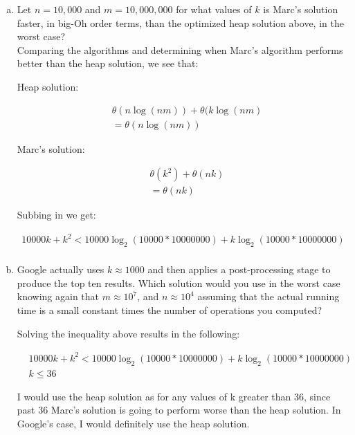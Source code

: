 \documentclass[12pt]{article}
\begin{document}
\begin{enumerate}[(a)]
\item Let $n=10,000$ and $m=10,000,000$ for what values of $k$ is Marc's solution faster, in big-Oh order terms, than the optimized
heap solution above, in the worst case?\\

Comparing the algorithms and determining when Marc's algorithm performs better than the heap solution, we see that:

Heap solution:

\begin{align*}
  &\theta(n\log (nm)) + \theta(k\log (nm)\\
  &=\theta(n\log(nm))
\end{align*}

Marc's solution:

\begin{align*}
  &\theta(k^2) + \theta(nk)\\
  &=\theta(nk)
\end{align*}


Subbing in we get:

\begin{align*}
  10000k + k^2 < 10000\log_2 (10000*10000000) + k\log_2 (10000*10000000)\\
\end{align*}

\item Google actually uses $k\approx 1000$ and then applies a post-processing stage to produce the top ten
results. Which solution would you use in the worst case knowing again that $m\approx 10^7$, and $n\approx 10^4$ assuming that the actual
running time is a small constant times the number of operations you computed?

Solving the inequality above results in the following:

\begin{align*}
  &10000k + k^2 < 10000\log_2 (10000*10000000) + k\log_2 (10000*10000000)\\
  &k \leq 36
\end{align*}

I would use the heap solution as for any values of k greater than 36, since past 36 Marc's solution is going to perform worse than the heap solution. In Google's case, I would definitely use the heap solution.
\end{enumerate}
\end{document}
